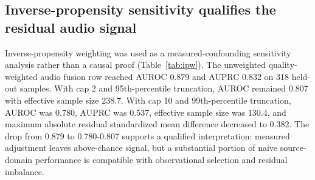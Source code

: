 \documentclass[preprint,12pt]{elsarticle}
\begin{document}
\subsection{Inverse-propensity sensitivity qualifies the residual audio signal}

Inverse-propensity weighting was used as a measured-confounding sensitivity analysis rather than a causal proof (Table~\ref{tab:ipw}). The unweighted quality-weighted audio fusion row reached AUROC 0.879 and AUPRC 0.832 on 318 held-out samples. With cap 2 and 95th-percentile truncation, AUROC remained 0.807 with effective sample size 238.7. With cap 10 and 99th-percentile truncation, AUROC was 0.780, AUPRC was 0.537, effective sample size was 130.4, and maximum absolute residual standardized mean difference decreased to 0.382. The drop from 0.879 to 0.780-0.807 supports a qualified interpretation: measured adjustment leaves above-chance signal, but a substantial portion of naive source-domain performance is compatible with observational selection and residual imbalance.

\begin{table}[t]
\centering
\caption{Inverse-propensity sensitivity analysis for quality-weighted audio fusion. ESS denotes effective sample size and SMD denotes standardized mean difference.}
\label{tab:ipw}
\scriptsize
\setlength{\tabcolsep}{3pt}
\end{table}
\end{document}
